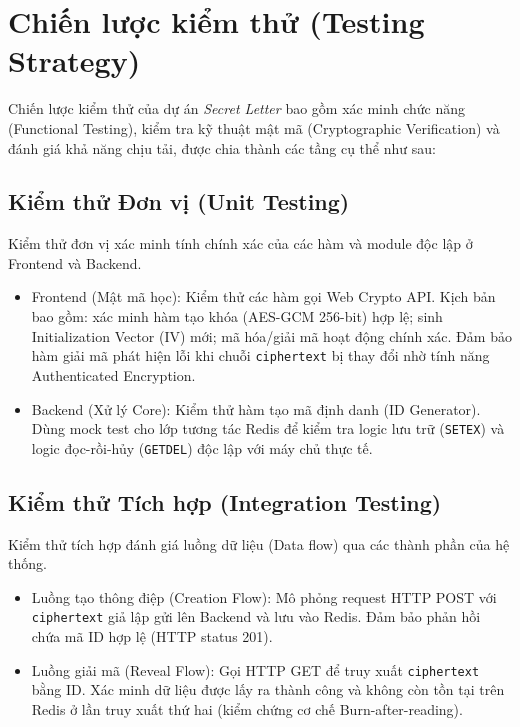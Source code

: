 \section{Chiến lược kiểm thử (Testing Strategy)}

Chiến lược kiểm thử của dự án \textit{Secret Letter} bao gồm xác minh chức năng (Functional Testing), kiểm tra kỹ thuật mật mã (Cryptographic Verification) và đánh giá khả năng chịu tải, được chia thành các tầng cụ thể như sau:

\subsection{Kiểm thử Đơn vị (Unit Testing)}

Kiểm thử đơn vị xác minh tính chính xác của các hàm và module độc lập ở Frontend và Backend.
\begin{itemize}
    \item Frontend (Mật mã học): Kiểm thử các hàm gọi Web Crypto API. Kịch bản bao gồm: xác minh hàm tạo khóa (AES-GCM 256-bit) hợp lệ; sinh Initialization Vector (IV) mới; mã hóa/giải mã hoạt động chính xác. Đảm bảo hàm giải mã phát hiện lỗi khi chuỗi \texttt{ciphertext} bị thay đổi nhờ tính năng Authenticated Encryption.
    \item Backend (Xử lý Core): Kiểm thử hàm tạo mã định danh (ID Generator). Dùng mock test cho lớp tương tác Redis để kiểm tra logic lưu trữ (\texttt{SETEX}) và logic đọc-rồi-hủy (\texttt{GETDEL}) độc lập với máy chủ thực tế.
\end{itemize}

\subsection{Kiểm thử Tích hợp (Integration Testing)}

Kiểm thử tích hợp đánh giá luồng dữ liệu (Data flow) qua các thành phần của hệ thống.
\begin{itemize}
    \item Luồng tạo thông điệp (Creation Flow): Mô phỏng request HTTP POST với \texttt{ciphertext} giả lập gửi lên Backend và lưu vào Redis. Đảm bảo phản hồi chứa mã ID hợp lệ (HTTP status 201).
    \item Luồng giải mã (Reveal Flow): Gọi HTTP GET để truy xuất \texttt{ciphertext} bằng ID. Xác minh dữ liệu được lấy ra thành công và không còn tồn tại trên Redis ở lần truy xuất thứ hai (kiểm chứng cơ chế Burn-after-reading).
\end{itemize}


